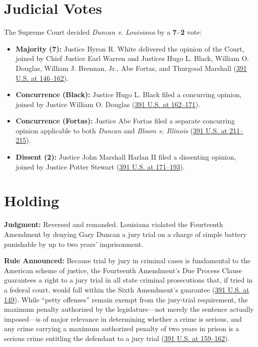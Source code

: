 \documentclass[12pt]{article}
\begin{document}
\section{Judicial Votes}

The Supreme Court decided \textit{Duncan v. Louisiana} by a \textbf{7--2} vote:

\begin{itemize}
  \item \textbf{Majority (7):} Justice Byron R. White delivered the opinion of the Court, joined by Chief Justice Earl Warren and Justices Hugo L. Black, William O. Douglas, William J. Brennan, Jr., Abe Fortas, and Thurgood Marshall (\href{https://supreme.justia.com/cases/federal/us/391/145/}{391 U.S. at 146--162}).
  \item \textbf{Concurrence (Black):} Justice Hugo L. Black filed a concurring opinion, joined by Justice William O. Douglas (\href{https://supreme.justia.com/cases/federal/us/391/145/}{391 U.S. at 162--171}).
  \item \textbf{Concurrence (Fortas):} Justice Abe Fortas filed a separate concurring opinion applicable to both \textit{Duncan} and \textit{Bloom v. Illinois} (\href{https://supreme.justia.com/cases/federal/us/391/194/}{391 U.S. at 211--215}).
  \item \textbf{Dissent (2):} Justice John Marshall Harlan II filed a dissenting opinion, joined by Justice Potter Stewart (\href{https://supreme.justia.com/cases/federal/us/391/145/}{391 U.S. at 171--193}).
\end{itemize}

\section{Holding}

\textbf{Judgment:} Reversed and remanded. Louisiana violated the Fourteenth Amendment by denying Gary Duncan a jury trial on a charge of simple battery punishable by up to two years' imprisonment.

\textbf{Rule Announced:} Because trial by jury in criminal cases is fundamental to the American scheme of justice, the Fourteenth Amendment's Due Process Clause guarantees a right to a jury trial in all state criminal prosecutions that, if tried in a federal court, would fall within the Sixth Amendment's guarantee (\href{https://supreme.justia.com/cases/federal/us/391/145/}{391 U.S. at 149}). While ``petty offenses'' remain exempt from the jury-trial requirement, the maximum penalty authorized by the legislature---not merely the sentence actually imposed---is of major relevance in determining whether a crime is serious, and any crime carrying a maximum authorized penalty of two years in prison is a serious crime entitling the defendant to a jury trial (\href{https://supreme.justia.com/cases/federal/us/391/145/}{391 U.S. at 159--162}).
\end{document}
